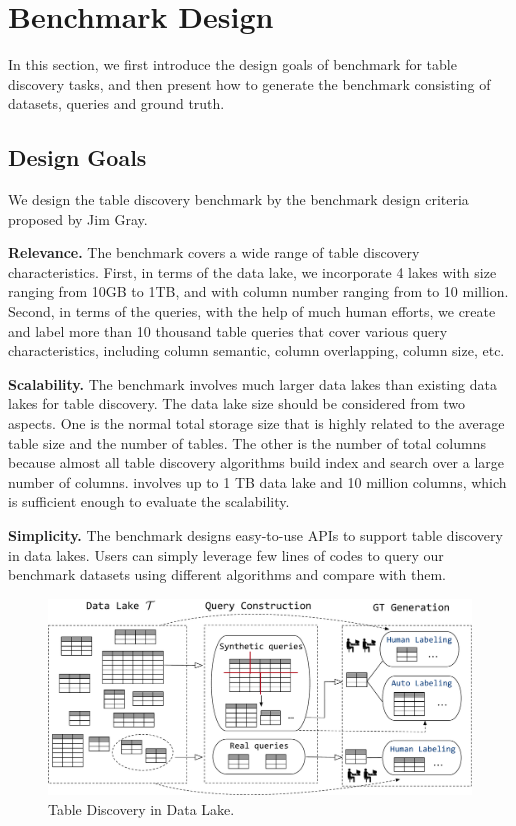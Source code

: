 \section{Benchmark Design} 
In this section, we first introduce the design goals of \sys benchmark for table discovery tasks, and then present how to generate the \sys benchmark consisting of datasets, queries and ground truth.

\subsection{Design Goals}
We design the table discovery benchmark by the 
benchmark design criteria proposed by Jim Gray.

\noindent\textbf{Relevance.}
The benchmark covers a wide range of table discovery characteristics. First, in terms of the data lake, we incorporate 4 lakes with size ranging from 10GB to 1TB, and with column number ranging from  to 10 million. Second, in terms of the queries, with the help of much human efforts, we create and label more than 10 thousand table queries that cover various query characteristics, including column semantic, column overlapping, column size, etc.



\noindent\textbf{Scalability.} The benchmark involves much larger data lakes than existing data lakes for table discovery. The data lake size should be considered from two aspects. One is the normal total storage size that is highly related  to the average table size  and the number of tables. The other is the number of total columns because almost all table discovery algorithms build index and search over a large number of columns.  \sys involves up to 1 TB data lake and 10 million columns, which is sufficient enough to evaluate the scalability.




\noindent\textbf{Simplicity.} The benchmark designs easy-to-use APIs to support table discovery in data lakes. Users can simply leverage few lines of codes to query our benchmark datasets using different algorithms and compare with them.





\begin{figure}[h]
	\centering
	\includegraphics[width=1\linewidth]{fig/benchmark.pdf}
	\caption{Table Discovery in Data Lake.}
	\label{fig:xx}
\end{figure}




